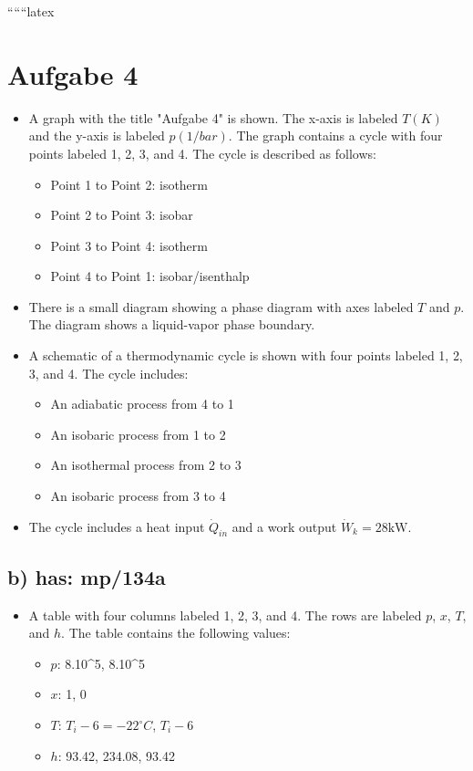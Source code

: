 
``````latex


\section*{Aufgabe 4}

\begin{itemize}
    \item A graph with the title "Aufgabe 4" is shown. The x-axis is labeled $T (K)$ and the y-axis is labeled $p (1/bar)$. The graph contains a cycle with four points labeled 1, 2, 3, and 4. The cycle is described as follows:
    \begin{itemize}
        \item Point 1 to Point 2: isotherm
        \item Point 2 to Point 3: isobar
        \item Point 3 to Point 4: isotherm
        \item Point 4 to Point 1: isobar/isenthalp
    \end{itemize}
    \item There is a small diagram showing a phase diagram with axes labeled $T$ and $p$. The diagram shows a liquid-vapor phase boundary.
    \item A schematic of a thermodynamic cycle is shown with four points labeled 1, 2, 3, and 4. The cycle includes:
    \begin{itemize}
        \item An adiabatic process from 4 to 1
        \item An isobaric process from 1 to 2
        \item An isothermal process from 2 to 3
        \item An isobaric process from 3 to 4
    \end{itemize}
    \item The cycle includes a heat input $\dot{Q}_{in}$ and a work output $\dot{W}_k = 28 \text{kW}$.
\end{itemize}

\subsection*{b) has: mp/134a}

\begin{itemize}
    \item A table with four columns labeled 1, 2, 3, and 4. The rows are labeled $p$, $x$, $T$, and $h$. The table contains the following values:
    \begin{itemize}
        \item $p$: 8.10^5, 8.10^5
        \item $x$: 1, 0
        \item $T$: $T_i - 6 = -22^\circ C$, $T_i - 6$
        \item $h$: 93.42, 234.08, 93.42
    \end{itemize}
\end{itemize}

